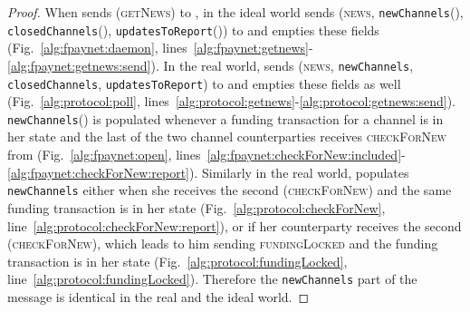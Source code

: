 \begin{proof}
  When \environment{} sends (\textsc{getNews}) to \alice, in the ideal world
  \fpaynet{} sends (\textsc{news}, \texttt{newChannels}(\alice),
  \texttt{closedChannels}(\alice), \texttt{updatesToReport}(\alice)) to
  \environment{} and empties these fields (Fig.~\ref{alg:fpaynet:daemon},
  lines~\ref{alg:fpaynet:getnews}-\ref{alg:fpaynet:getnews:send}). In the real
  world, \alice{} sends (\textsc{news}, \texttt{newChannels},
  \texttt{closedChannels}, \texttt{updatesToReport}) to \environment{} and
  empties these fields as well (Fig.~\ref{alg:protocol:poll},
  lines~\ref{alg:protocol:getnews}-\ref{alg:protocol:getnews:send}).
  \texttt{newChannels}(\alice) is populated whenever a funding transaction for a
  channel is in her state and the last of the two channel counterparties
  receives \textsc{checkForNew} from \environment{} (Fig.~\ref{alg:fpaynet:open},
  lines~\ref{alg:fpaynet:checkForNew:included}-\ref{alg:fpaynet:checkForNew:report}).
  Similarly in the real world, \alice{} populates \texttt{newChannels} either
  when she receives the second (\textsc{checkForNew}) and the same funding
  transaction is in her state (Fig.~\ref{alg:protocol:checkForNew},
  line~\ref{alg:protocol:checkForNew:report}), or if her counterparty receives the
  second (\textsc{checkForNew}), which leads to him sending \textsc{fundingLocked}
  and the funding transaction is in her state
  (Fig.~\ref{alg:protocol:fundingLocked},
  line~\ref{alg:protocol:fundingLocked}).  Therefore the
  \texttt{newChannels} part of the message is identical in the real and the
  ideal world.



\end{proof}
